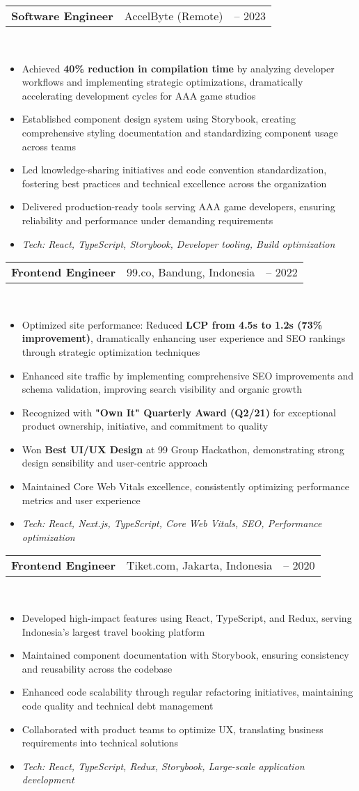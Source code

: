 \documentclass[a4paper, 11pt]{article}
\newcommand{\resumeItem}[1]{
  \item\small{
    {#1 \vspace{-2pt}}
  }
}
\newcommand{\resumeSubheading}[4]{
  \vspace{-2pt}\item
    \begin{tabularx}{0.987\textwidth}[t]{
  >{\raggedright\arraybackslash}X
  >{\centering\arraybackslash}X
  >{\raggedleft\arraybackslash}X }
      \textbf{#1} & #2 & #3 \\
    \end{tabularx}
    \textit{\small#4}\\
    \vspace{-7pt}
}
\newcommand{\resumeItemListStart}{\begin{itemize}[leftmargin=0.22in]}
\newcommand{\resumeItemListEnd}{\end{itemize}\vspace{-20pt}}
\begin{document}
        \resumeSubheading
            {Software Engineer}{AccelByte (Remote)}{2022 -- 2023}{}
            \resumeItemListStart
                \resumeItem{Achieved \textbf{40\% reduction in compilation time} by analyzing developer workflows and implementing strategic optimizations, dramatically accelerating development cycles for AAA game studios}
                \resumeItem{Established component design system using Storybook, creating comprehensive styling documentation and standardizing component usage across teams}
                \resumeItem{Led knowledge-sharing initiatives and code convention standardization, fostering best practices and technical excellence across the organization}
                \resumeItem{Delivered production-ready tools serving AAA game developers, ensuring reliability and performance under demanding requirements}
                \resumeItem{\textit{Tech: React, TypeScript, Storybook, Developer tooling, Build optimization}}
            \resumeItemListEnd

        \resumeSubheading
            {Frontend Engineer}{99.co, Bandung, Indonesia}{2020 -- 2022}{}
            \resumeItemListStart
                \resumeItem{Optimized site performance: Reduced \textbf{LCP from 4.5s to 1.2s (73\% improvement)}, dramatically enhancing user experience and SEO rankings through strategic optimization techniques}
                \resumeItem{Enhanced site traffic by implementing comprehensive SEO improvements and schema validation, improving search visibility and organic growth}
                \resumeItem{Recognized with \textbf{"Own It" Quarterly Award (Q2/21)} for exceptional product ownership, initiative, and commitment to quality}
                \resumeItem{Won \textbf{Best UI/UX Design} at 99 Group Hackathon, demonstrating strong design sensibility and user-centric approach}
                \resumeItem{Maintained Core Web Vitals excellence, consistently optimizing performance metrics and user experience}
                \resumeItem{\textit{Tech: React, Next.js, TypeScript, Core Web Vitals, SEO, Performance optimization}}
            \resumeItemListEnd

        \resumeSubheading
            {Frontend Engineer}{Tiket.com, Jakarta, Indonesia}{2019 -- 2020}{}
            \resumeItemListStart
                \resumeItem{Developed high-impact features using React, TypeScript, and Redux, serving Indonesia's largest travel booking platform}
                \resumeItem{Maintained component documentation with Storybook, ensuring consistency and reusability across the codebase}
                \resumeItem{Enhanced code scalability through regular refactoring initiatives, maintaining code quality and technical debt management}
                \resumeItem{Collaborated with product teams to optimize UX, translating business requirements into technical solutions}
                \resumeItem{\textit{Tech: React, TypeScript, Redux, Storybook, Large-scale application development}}
            \resumeItemListEnd
\end{document}
